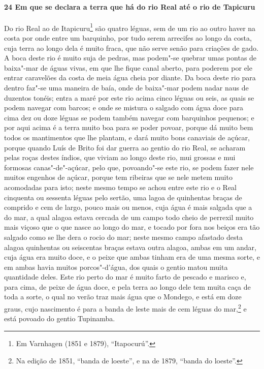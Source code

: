 \begin{linenumbers}
\paragraph{24 Em que se declara a terra que há do rio Real até o rio de Tapicuru} \quad
Do rio Real ao de Itapicuru\footnote{ Em Varnhagen (1851 e 1879), ``Itapocurú''.} são
quatro léguas, sem de um rio ao outro haver na costa por onde entre um barquinho, por tudo
serem arrecifes ao longo da costa, cuja terra ao longo dela é muito fraca, que não serve
senão para criações de gado. A boca deste rio é muito suja de pedras, mas podem"-se quebrar
umas pontas de baixa"-mar de águas vivas, em que lhe fique canal aberto, para poderem por
ele entrar caravelões da costa de meia água cheia por diante. Da boca deste rio para
dentro faz"-se uma maneira de baía, onde de baixa"-mar podem nadar naus de duzentos tonéis;
entra a maré por este rio acima cinco léguas ou seis, as quais se podem navegar com
barcos; e onde se mistura o salgado com água doce para cima dez ou doze léguas se podem
também navegar com barquinhos pequenos; e por aqui acima é a terra muito boa para se poder
povoar, porque dá muito bem todos os mantimentos que lhe plantam, e dará muito bons
canaviais de açúcar, porque quando Luís de Brito foi dar guerra ao gentio do rio Real, se
acharam pelas roças destes índios, que viviam ao longo deste rio, mui grossas e mui
formosas canas"-de"-açúcar, pelo que, povoando"-se este rio, se podem fazer nele muitos
engenhos de açúcar, porque tem ribeiras que se nele metem muito acomodadas para isto;
neste mesmo tempo se achou entre este rio e o Real cinquenta ou sessenta léguas pelo
sertão, uma lagoa de quinhentas braças de comprido e cem de largo, pouco mais ou menos,
cuja água é mais salgada que a do mar, a qual alagoa estava cercada de um campo todo cheio
de perrexil muito mais viçoso que o que nasce ao longo do mar, e tocado por fora nos
beiços era tão salgado como se lhe dera o rocio do mar; neste mesmo campo afastado desta
alagoa quinhentas ou seiscentas braças estava outra alagoa, ambas em um andar, cuja água
era muito doce, e o peixe que ambas tinham era de uma mesma sorte, e em ambas havia muitos
porcos"-d'água, dos quais o gentio matou muita quantidade deles. Este rio perto do mar é
muito farto de pescado e marisco e, para cima, de peixe de água doce, e pela terra ao
longo dele tem muita caça de toda a sorte, o qual no verão traz mais água que o Mondego, e
está em doze graus, cujo nascimento é para a banda de leste mais de cem léguas do
mar,\footnote{ Na edição de 1851, ``banda de loeste'', e na de 1879, ``banda do loeste''.}
e está povoado do gentio Tupinamba.


\end{linenumbers}
